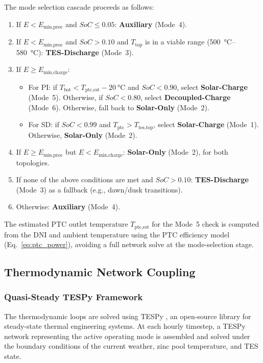 \documentclass[11pt,review,3p]{elsarticle}
\begin{document}
The mode selection cascade proceeds as follows:

\begin{enumerate}[leftmargin=*, itemsep=2pt]
    \item If $E < E_{\text{min,proc}}$ and $SoC \le 0.05$: \textbf{Auxiliary} (Mode~4).
    \item If $E < E_{\text{min,proc}}$ and $SoC > 0.10$ and $T_{\text{top}}$ is in a viable range (\SIrange{500}{580}{\celsius}): \textbf{TES-Discharge} (Mode~3).
    \item If $E \ge E_{\text{min,charge}}$:
    \begin{itemize}
        \item For PI: if $T_{\text{bot}} < T_{\text{ptc,est}} - \SI{20}{\celsius}$ and $SoC < 0.90$, select \textbf{Solar-Charge} (Mode~5). Otherwise, if $SoC < 0.80$, select \textbf{Decoupled-Charge} (Mode~6). Otherwise, fall back to \textbf{Solar-Only} (Mode~2).
        \item For SD: if $SoC < 0.99$ and $T_{\text{ptc}} > T_{\text{tes,top}}$, select \textbf{Solar-Charge} (Mode~1). Otherwise, \textbf{Solar-Only} (Mode~2).
    \end{itemize}
    \item If $E \ge E_{\text{min,proc}}$ but $E < E_{\text{min,charge}}$: \textbf{Solar-Only} (Mode~2), for both topologies.
    \item If none of the above conditions are met and $SoC > 0.10$: \textbf{TES-Discharge} (Mode~3) as a fallback (e.g., dawn/dusk transitions).
    \item Otherwise: \textbf{Auxiliary} (Mode~4).
\end{enumerate}

The estimated PTC outlet temperature $T_{\text{ptc,est}}$ for the Mode~5 check is computed from the DNI and ambient temperature using the PTC efficiency model (Eq.~\ref{eq:ptc_power}), avoiding a full network solve at the mode-selection stage.

\subsection{Thermodynamic Network Coupling}
\label{sec:coupling}

\subsubsection{Quasi-Steady TESPy Framework}
\label{sec:tespy_framework}

The thermodynamic loops are solved using TESPy \cite{Witte2020-vm}, an open-source library for steady-state thermal engineering systems. At each hourly timestep, a TESPy network representing the active operating mode is assembled and solved under the boundary conditions of the current weather, zinc pool temperature, and TES state.
\end{document}
